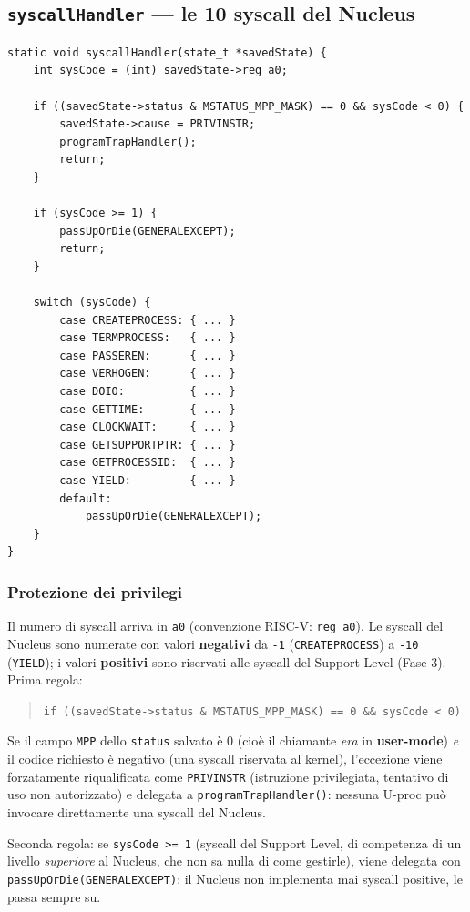 \documentclass[11pt,a4paper]{article}
\newcommand{\code}[1]{\texttt{#1}}
\newcommand{\func}[1]{\textbf{\texttt{#1}}}
\begin{document}
\subsection{\func{syscallHandler} --- le 10 syscall del Nucleus}
\begin{lstlisting}
static void syscallHandler(state_t *savedState) {
    int sysCode = (int) savedState->reg_a0;

    if ((savedState->status & MSTATUS_MPP_MASK) == 0 && sysCode < 0) {
        savedState->cause = PRIVINSTR;
        programTrapHandler();
        return;
    }

    if (sysCode >= 1) {
        passUpOrDie(GENERALEXCEPT);
        return;
    }

    switch (sysCode) {
        case CREATEPROCESS: { ... }
        case TERMPROCESS:   { ... }
        case PASSEREN:      { ... }
        case VERHOGEN:      { ... }
        case DOIO:          { ... }
        case GETTIME:       { ... }
        case CLOCKWAIT:     { ... }
        case GETSUPPORTPTR: { ... }
        case GETPROCESSID:  { ... }
        case YIELD:         { ... }
        default:
            passUpOrDie(GENERALEXCEPT);
    }
}
\end{lstlisting}

\subsubsection{Protezione dei privilegi}
Il numero di syscall arriva in \code{a0} (convenzione RISC-V:
\code{reg\_a0}). Le syscall del Nucleus sono numerate con valori
\textbf{negativi} da \code{-1} (\code{CREATEPROCESS}) a \code{-10}
(\code{YIELD}); i valori \textbf{positivi} sono riservati alle syscall del
Support Level (Fase 3). Prima regola:
\begin{quote}
\code{if ((savedState->status \& MSTATUS\_MPP\_MASK) == 0 \&\& sysCode < 0)}
\end{quote}
Se il campo \code{MPP} dello \code{status} salvato è 0 (cioè il chiamante
\emph{era} in \textbf{user-mode}) \emph{e} il codice richiesto è negativo
(una syscall riservata al kernel), l'eccezione viene forzatamente
riqualificata come \code{PRIVINSTR} (istruzione privilegiata, tentativo di
uso non autorizzato) e delegata a \code{programTrapHandler()}: nessuna
U-proc può invocare direttamente una syscall del Nucleus.

Seconda regola: se \code{sysCode >= 1} (syscall del Support Level, di
competenza di un livello \emph{superiore} al Nucleus, che non sa nulla di
come gestirle), viene delegata con \code{passUpOrDie(GENERALEXCEPT)}: il
Nucleus non implementa mai syscall positive, le passa sempre su.
\end{document}
